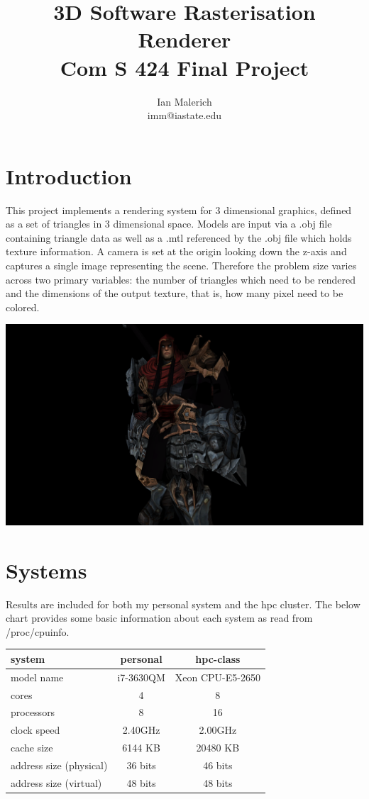 \documentclass[12pt]{article}
\title{3D Software Rasterisation Renderer \\ \large Com S 424 Final Project}
\author{Ian Malerich \\ imm@iastate.edu}
\begin{document}
\maketitle

\section*{Introduction}

This project implements a rendering system for 3 dimensional graphics, defined as a set
of triangles in 3 dimensional space. Models are input via a .obj file containing triangle data
as well as a .mtl referenced by the .obj file which holds texture information. A camera is set
at the origin looking down the z-axis and captures a single image representing the scene.
Therefore the problem size varies across two primary variables: the number of triangles which
need to be rendered and the dimensions of the output texture, that is, how many pixel need
to be colored.

\bigbreak
\begin{center}
	\includegraphics[scale=0.13]{war.png}
\end{center}

\clearpage
\section*{Systems}

Results are included for both my personal system and the hpc cluster. The below chart provides some basic
information about each system as read from /proc/cpuinfo.

\bigbreak
\begin{center}
	\begin{tabular}{|l|c|c|}
		\hline
		system & personal & hpc-class \\ \hline \hline
		model name & i7-3630QM & Xeon CPU-E5-2650 \\ \hline
		cores & 4 & 8 \\ \hline
		processors & 8 & 16 \\ \hline
		clock speed & 2.40GHz & 2.00GHz \\ \hline
		cache size & 6144 KB & 20480 KB \\ \hline
		address size (physical) & 36 bits & 46 bits \\ \hline
		address size (virtual) & 48 bits & 48 bits \\ \hline
	\end{tabular}
\end{center}
\end{document}
